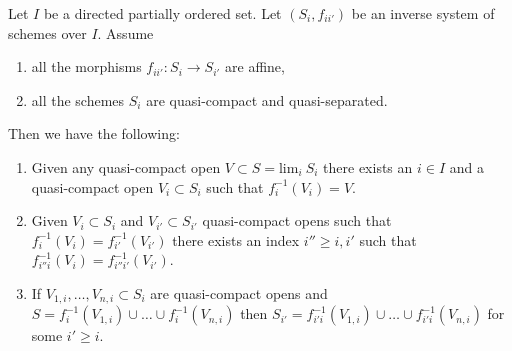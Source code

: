 \begin{lemma}
\label{lemma-descend-opens}
Let $I$ be a directed partially ordered set.
Let $(S_i, f_{ii'})$ be an inverse system of
schemes over $I$. Assume
\begin{enumerate}
\item all the morphisms $f_{ii'} : S_i \to S_{i'}$ are affine,
\item all the schemes $S_i$ are quasi-compact and quasi-separated.
\end{enumerate}
Then we have the following:
\begin{enumerate}
\item Given any quasi-compact open $V \subset S = \text{lim}_i\ S_i$
there exists an $i \in I$ and a quasi-compact open $V_i \subset S_i$
such that $f_i^{-1}(V_i) = V$.
\item Given $V_i \subset S_i$ and $V_{i'} \subset S_{i'}$
quasi-compact opens such that $f_i^{-1}(V_i) = f_{i'}^{-1}(V_{i'})$
there exists an index $i'' \geq i, i'$ such that
$f_{i''i}^{-1}(V_i) = f_{i''i'}^{-1}(V_{i'})$.
\item If $V_{1, i}, \ldots, V_{n, i} \subset S_i$ are quasi-compact
opens and $S = f_i^{-1}(V_{1, i}) \cup \ldots \cup f_i^{-1}(V_{n, i})$
then $S_{i'} = f_{i'i}^{-1}(V_{1, i}) \cup \ldots \cup f_{i'i}^{-1}(V_{n, i})$
for some $i' \geq i$.
\end{enumerate}
\end{lemma}

